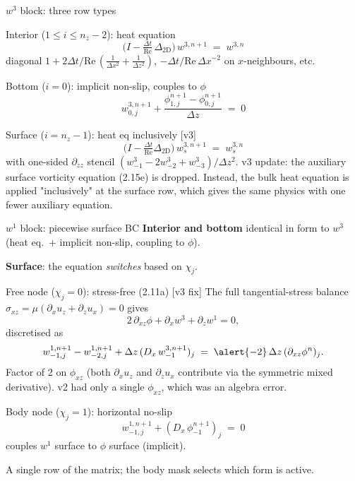 \documentclass[aspectratio=169, 10pt]{beamer}
\newcommand{\Rey}{\mathrm{Re}}
\begin{document}
\begin{frame}{$w^3$ block: three row types}
\begin{block}{Interior ($1 \le i \le n_z-2$): heat equation}
\[
\Big(I - \tfrac{\Delta t}{\Rey}\,\Delta_{2\text{D}}\Big)\,w^{3,n+1} \;=\; w^{3,n}
\]
\small diagonal $1 + 2\Delta t/\Rey\,(\tfrac{1}{\Delta x^2} + \tfrac{1}{\Delta z^2})$, $-\Delta t/\Rey\,\Delta x^{-2}$ on $x$-neighbours, etc.
\end{block}

\begin{block}{Bottom ($i = 0$): implicit non-slip, couples to $\phi$}
\[
w^{3,n+1}_{0,j} + \frac{\phi^{n+1}_{1,j} - \phi^{n+1}_{0,j}}{\Delta z} \;=\; 0
\]
\end{block}

\begin{block}{Surface ($i = n_z-1$): heat eq inclusively \alert{[v3]}}
\[
\Big(I - \tfrac{\Delta t}{\Rey}\Delta_{2\text{D}}\Big)\, w^{3,n+1}_s \;=\; w^{3,n}_s
\]
with one-sided $\partial_{zz}$ stencil $(w^3_{-1} - 2 w^3_{-2} + w^3_{-3})/\Delta z^2$.
\vspace{0.2em}
\small \alert{v3 update}: the auxiliary surface vorticity equation (2.15e) is dropped.  Instead, the bulk heat equation is applied "inclusively" at the surface row, which gives the same physics with one fewer auxiliary equation.
\end{block}
\end{frame}

\begin{frame}{$w^1$ block: piecewise surface BC}
\textbf{Interior and bottom} identical in form to $w^3$ (heat eq.\ + implicit non-slip, coupling to $\phi$).

\vspace{0.6em}
\textbf{Surface}: the equation \emph{switches} based on $\chi_j$.

\begin{block}{Free node ($\chi_j = 0$): stress-free (2.11a) \alert{[v3 fix]}}
The full tangential-stress balance $\sigma_{xz} = \mu(\partial_x u_z + \partial_z u_x) = 0$ gives
\[
2\,\partial_{xz}\phi + \partial_x w^3 + \partial_z w^1 = 0,
\]
discretised as
\[
w^{1,n+1}_{-1,j} - w^{1,n+1}_{-2,j} + \Delta z\,(D_x\,w^{3,n+1}_{-1})_j \;=\; \alert{-2}\,\Delta z\,(\partial_{xz}\phi^n)_j.
\]
\small \alert{Factor of 2 on $\phi_{xz}$} (both $\partial_x u_z$ and $\partial_z u_x$ contribute via the symmetric mixed derivative).  v2 had only a single $\phi_{xz}$, which was an algebra error.
\end{block}

\begin{block}{Body node ($\chi_j = 1$): horizontal no-slip}
\[
w^{1,n+1}_{-1,j} + (D_x\,\phi^{n+1}_{-1})_j \;=\; 0
\]
\small couples $w^1$ surface to $\phi$ surface (implicit).
\end{block}

\vspace{0.3em}
\small
A single row of the matrix; the body mask selects which form is active.
\end{frame}
\end{document}
